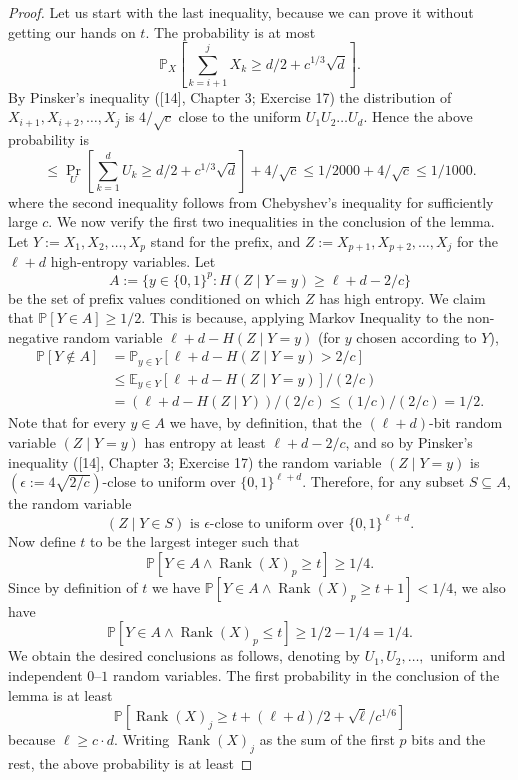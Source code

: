 \begin{proof}
Let us start with the last inequality, because we can prove it without getting our hands on $t$. The probability is at most
\[\mathbb P_X\left[\sum_{k=i+1}^jX_k\geq d/2+c^{1/3}\sqrt d\right].\]
By Pinsker's inequality ([14], Chapter 3; Exercise 17) the distribution of $X_{i+1},X_{i+2},\ldots,X_j$ is $4/\sqrt c$ close to the uniform $U_1U_2\ldots U_d$. Hence the above probability is
\[\leq\Pr_U\left[\sum_{k=1}^dU_k\geq d/2+c^{1/3}\sqrt d\right]+4/\sqrt c\leq1/2000+4/\sqrt c\leq1/1000.\]
where the second inequality follows from Chebyshev's inequality for sufficiently large $c$.
We now verify the first two inequalities in the conclusion of the lemma. Let $Y:=X_1,X_2,\ldots,X_p$ stand for the prefix, and $Z:=X_{p+1},X_{p+2},\ldots,X_j$ for the $\ell+d$ high-entropy variables. Let
\[A:=\{y\in\{0,1\}^p:H(Z\mid Y=y)\geq\ell+d-2/c\}\]
be the set of prefix values conditioned on which $Z$ has high entropy. We claim that $\mathbb P[Y\in A]\geq1/2$. This is because, applying Markov Inequality to the non-negative random variable $\ell+d-H(Z\mid Y=y)$ (for $y$ chosen according to $Y$),
\begin{align*}
\mathbb P[Y\notin A]&=\mathbb P_{y\in Y}[\ell+d-H(Z\mid Y=y)>2/c]\\
&\leq\mathbb E_{y\in Y}[\ell+d-H(Z\mid Y=y)]/(2/c)\\
&=(\ell+d-H(Z\mid Y))/(2/c)\leq(1/c)/(2/c)=1/2.
\end{align*}
Note that for every $y\in A$ we have, by definition, that the $(\ell+d)$-bit random variable $(Z\mid Y=y)$ has entropy at least $\ell+d-2/c$, and so by Pinsker's inequality ([14], Chapter 3; Exercise 17) the random variable $(Z\mid Y=y)$ is $(\epsilon:=4\sqrt{2/c})$-close to uniform over $\{0,1\}^{\ell+d}$. Therefore, for any subset $S\subseteq A$, the random variable
\[(Z\mid Y\in S)\text{ is }\epsilon\text{-close to uniform over }\{0,1\}^{\ell+d}.\tag{2}\]
Now define $t$ to be the largest integer such that
\[\mathbb P[Y\in A\wedge\operatorname{Rank}(X)_p\geq t]\geq1/4.\tag{3}\]
Since by definition of $t$ we have $\mathbb P[Y\in A\wedge\operatorname{Rank}(X)_p\geq t+1]<1/4$, we also have
\[\mathbb P[Y\in A\wedge\operatorname{Rank}(X)_p\leq t]\geq1/2-1/4=1/4.\tag{4}\]
We obtain the desired conclusions as follows, denoting by $U_1,U_2,\ldots,$ uniform and independent $0$--$1$ random variables. The first probability in the conclusion of the lemma is at least
\[\mathbb P[\operatorname{Rank}(X)_j\geq t+(\ell+d)/2+\sqrt\ell/c^{1/6}]\]
because $\ell\geq c\cdot d$.
Writing $\operatorname{Rank}(X)_j$ as the sum of the first $p$ bits and the rest, the above probability is at least

\end{proof}
